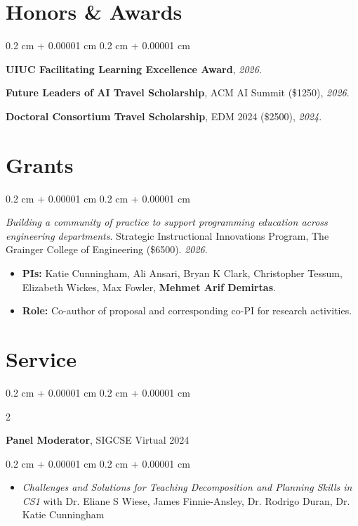 \documentclass[10pt, letterpaper]{article}
\newenvironment{highlights}{
    \begin{itemize}[
        topsep=0.10 cm,
        parsep=0.10 cm,
        partopsep=0pt,
        itemsep=0pt,
        leftmargin=0.4 cm + 10pt
    ]
}{
    \end{itemize}
} %
\newenvironment{onecolentry}{
    \begin{adjustwidth}{
        0.2 cm + 0.00001 cm
    }{
        0.2 cm + 0.00001 cm
    }
}{
    \end{adjustwidth}
} %
\newenvironment{twocolentry}[2][]{
    \onecolentry
    \def\secondColumn{#2}
    \setcolumnwidth{\fill, 4.5 cm}
    \begin{paracol}{2}
}{
    \switchcolumn \raggedleft \secondColumn
    \end{paracol}
    \endonecolentry
} %
\begin{document}
\section{Honors \& Awards}
    \begin{onecolentry}
            \textbf{UIUC Facilitating Learning Excellence Award}, \textit{2026}.
            
            \textbf{Future Leaders of AI Travel Scholarship}, ACM AI Summit (\$1250), \textit{2026}.
            
            \textbf{Doctoral Consortium Travel Scholarship}, EDM 2024 (\$2500), \textit{2024}.
    \end{onecolentry}


    \section{Grants}
    \begin{onecolentry}
            \textit{Building a community of practice to support programming education across engineering departments}. Strategic Instructional Innovations Program, The Grainger College of Engineering (\$6500). \textit{2026}.
            \begin{itemize}
                \item \textbf{PIs:} Katie Cunningham, Ali Ansari, Bryan K Clark, Christopher Tessum, Elizabeth Wickes, Max Fowler, \textbf{Mehmet Arif Demirtas}. 
                \item \textbf{Role:} Co-author of proposal and corresponding co-PI for research activities. 
            \end{itemize}
    \end{onecolentry}

    \vspace{0.2 cm}


    \section{Service}

        \begin{twocolentry}{
            
            
        }
            \textbf{Panel Moderator}, SIGCSE Virtual 2024
        \end{twocolentry}

        \vspace{0.10 cm}
        \begin{onecolentry}
            \begin{highlights}
                \item \textit{Challenges and Solutions for Teaching Decomposition and Planning Skills in CS1} with Dr. Eliane S Wiese, James Finnie-Ansley, Dr. Rodrigo Duran, Dr. Katie Cunningham
            \end{highlights}
        \end{onecolentry}
        \vspace{0.2 cm}
\end{document}
